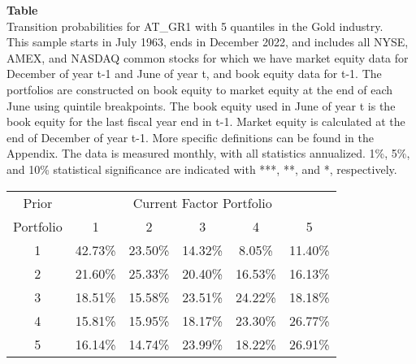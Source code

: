 \begin{table*}[ht!]
\raggedright
{}
\label{tab: transition_probs_AT_GR1_Gold_with_5_quantiles}
\textbf{Table \thetable} \\
Transition probabilities for AT_GR1 with 5 quantiles in the Gold industry. \\
\hspace*{1em}This sample starts in July 1963, ends in December 2022, and includes all NYSE, AMEX, and NASDAQ common stocks for which we have market equity data for December of year t-1 and June of year t, and book equity data for t-1. The portfolios are constructed on book equity to market equity at the end of each June using quintile breakpoints.  The book equity used in June of year t is the book equity for the last fiscal year end in t-1.  Market equity is calculated at the end of December of year t-1.  More specific definitions can be found in the Appendix.  The data is measured monthly, with all statistics annualized.  1\%, 5\%, and 10\% statistical significance are indicated with ***, **, and *, respectively. \\
\vspace{0.5em}
\centering
\begin{adjustbox}{max width=\textwidth}
\begin{tabular}{@{}cccccc@{}}
\toprule
Prior & \multicolumn{5}{c}{Current Factor Portfolio} \\
Portfolio & 1 & 2 & 3 & 4 & 5 \\
\midrule
1 & 42.73\% & 23.50\% & 14.32\% & 8.05\% & 11.40\% \\
2 & 21.60\% & 25.33\% & 20.40\% & 16.53\% & 16.13\% \\
3 & 18.51\% & 15.58\% & 23.51\% & 24.22\% & 18.18\% \\
4 & 15.81\% & 15.95\% & 18.17\% & 23.30\% & 26.77\% \\
5 & 16.14\% & 14.74\% & 23.99\% & 18.22\% & 26.91\% \\
\bottomrule
\end{tabular}
\end{adjustbox}
\end{table*}